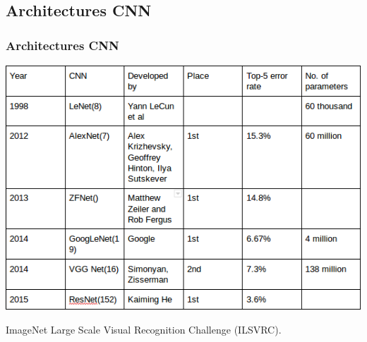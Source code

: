 \documentclass[11pt]{beamer}
\begin{document}
\subsection{Architectures CNN}
\begin{frame}
\frametitle{Architectures CNN}
\begin{center}
\includegraphics[scale=0.4]{img32.png}
\end{center}
ImageNet Large Scale Visual Recognition Challenge (ILSVRC).
\end{frame}
\end{document}

